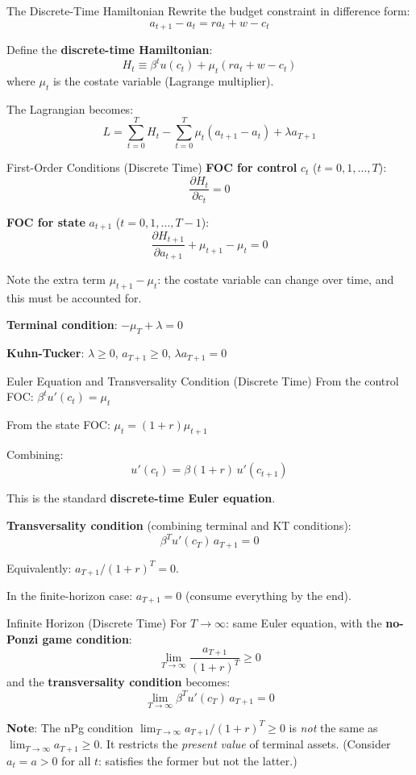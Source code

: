 \documentclass[blue]{beamer}
\begin{document}
\begin{frame}{The Discrete-Time Hamiltonian}
	Rewrite the budget constraint in difference form:
	\[
	a_{t+1} - a_t = ra_t + w - c_t
	\]
	
	Define the \textbf{discrete-time Hamiltonian}:
	\[
	H_t \equiv \beta^t u(c_t) + \mu_t(ra_t + w - c_t)
	\]
	where $\mu_t$ is the costate variable (Lagrange multiplier).
	
	\bigskip
	The Lagrangian becomes:
	\[
	{L} = \sum_{t=0}^T H_t - \sum_{t=0}^T \mu_t(a_{t+1} - a_t) + \lambda a_{T+1}
	\]
\end{frame}

\begin{frame}{First-Order Conditions (Discrete Time)}
	\textbf{FOC for control} $c_t$ ($t = 0, 1, \ldots, T$):
	\[
	\frac{\partial H_t}{\partial c_t} = 0
	\]
	
	\textbf{FOC for state} $a_{t+1}$ ($t = 0, 1, \ldots, T-1$):
	\[
	\frac{\partial H_{t+1}}{\partial a_{t+1}} + \mu_{t+1} - \mu_t = 0
	\]
	
	Note the extra term $\mu_{t+1} - \mu_t$: the costate variable can change over time, and this must be accounted for.
	
	\bigskip
	\textbf{Terminal condition}: $-\mu_T + \lambda = 0$
	
	\textbf{Kuhn-Tucker}: $\lambda \geq 0$, $a_{T+1} \geq 0$, $\lambda a_{T+1} = 0$
\end{frame}

\begin{frame}{Euler Equation and Transversality Condition (Discrete Time)}
	From the control FOC: $\beta^t u'(c_t) = \mu_t$
	
	From the state FOC: $\mu_t = (1+r)\mu_{t+1}$
	
	\bigskip
	Combining:
	\[
	{u'(c_t) = \beta(1+r)\, u'(c_{t+1})}
	\]
	
	This is the standard \textbf{discrete-time Euler equation}.
	
	\bigskip
	\textbf{Transversality condition} (combining terminal and KT conditions):
	\[
	\beta^T u'(c_T)\, a_{T+1} = 0
	\]
	
	Equivalently: $a_{T+1}/(1+r)^T = 0$.
	
	In the finite-horizon case: $a_{T+1} = 0$ (consume everything by the end).
\end{frame}


\begin{frame}{Infinite Horizon (Discrete Time)}
	For $T \to \infty$: same Euler equation, with the \textbf{no-Ponzi game condition}:
	\[
	\lim_{T\to\infty} \frac{a_{T+1}}{(1+r)^T} \geq 0
	\]
	and the \textbf{transversality condition} becomes:
	\[
	\lim_{T\to\infty} \beta^T u'(c_T)\, a_{T+1} = 0
	\]
	
	\bigskip
	\textbf{Note}: The nPg condition $\lim_{T\to\infty} a_{T+1}/(1+r)^T \geq 0$ is \emph{not} the same as $\lim_{T\to\infty} a_{T+1} \geq 0$. It restricts the \emph{present value} of terminal assets. (Consider $a_t = a > 0$ for all $t$: satisfies the former but not the latter.) 
\end{frame}
\end{document}
